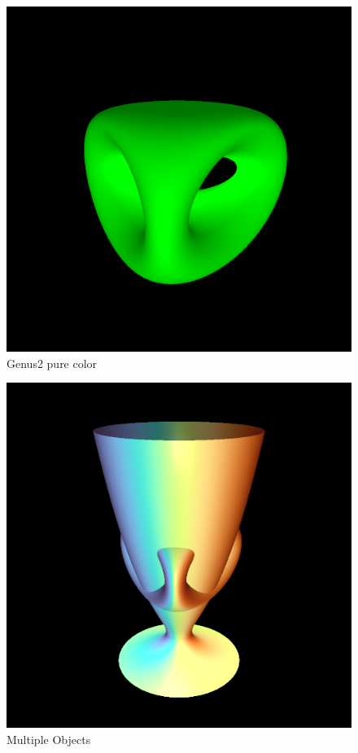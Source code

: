 \documentclass[acmtog]{acmart}
\begin{document}
\begin{figure}[h]
    \centering
    \includegraphics[scale=0.35]{../Coding/images/fw_genus2_pure_color.png}
    \caption{Genus2 pure color}
\end{figure}

\begin{figure}[h]
    \centering
    \includegraphics[scale=0.35]{../Coding/images/wineglass_genus2.png}
    \caption{Multiple Objects}
\end{figure}
\end{document}
